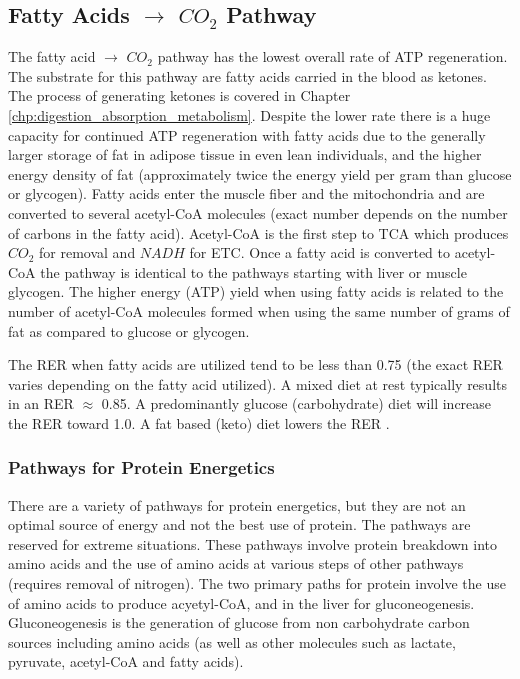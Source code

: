 \subsection{Fatty Acids $\rightarrow$ $CO_2$ Pathway}

The fatty acid $\rightarrow$ $CO_2$ pathway has the lowest overall rate of ATP regeneration.\footnotemark{} The substrate for this pathway are fatty acids carried in the blood as ketones. The process of generating ketones is covered in Chapter \ref{chp:digestion_absorption_metabolism}. Despite the lower rate there is a huge capacity for continued ATP regeneration with fatty acids due to the generally larger storage of fat in adipose tissue in even lean individuals, and the higher energy density of fat (approximately twice the energy yield per gram than glucose or glycogen). Fatty acids enter the muscle fiber and the mitochondria and are converted to several acetyl-CoA molecules (exact number depends on the number of carbons in the fatty acid). Acetyl-CoA is the first step to TCA which produces $CO_2$ for removal and $NADH$ for ETC. Once a fatty acid is converted to acetyl-CoA the pathway is identical to the pathways starting with liver or muscle glycogen. The higher energy (ATP) yield when using fatty acids is related to the number of acetyl-CoA molecules formed when using the same number of grams of fat as compared to glucose or glycogen. 

The RER when fatty acids are utilized tend to be less than 0.75 (the exact RER varies depending on the fatty acid utilized). A mixed diet at rest typically results in an RER $\approx$ 0.85. A predominantly glucose (carbohydrate) diet will increase the RER toward 1.0. A fat based (keto) diet lowers the RER \cite{alessandro_effects_2015}.

\subsubsection{Pathways for Protein Energetics}

There are a variety of pathways for protein energetics, but they are not an optimal source of energy and not the best use of protein. The pathways are reserved for extreme situations. These pathways involve protein breakdown into amino acids and the use of amino acids at various steps of other pathways (requires removal of nitrogen). The two primary paths for protein involve the use of amino acids to produce acyetyl-CoA, and in the liver for gluconeogenesis. Gluconeogenesis is the generation of glucose from non carbohydrate carbon sources including amino acids (as well as other molecules such as lactate, pyruvate, acetyl-CoA and fatty acids).

